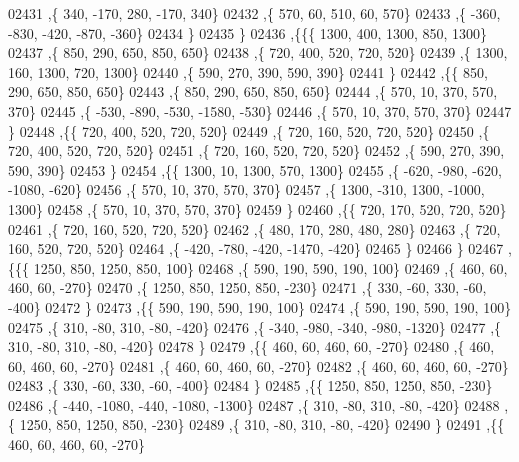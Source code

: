 \begin{DoxyCode}
02431     ,\{   340,  -170,   280,  -170,   340\}
02432     ,\{   570,    60,   510,    60,   570\}
02433     ,\{  -360,  -830,  -420,  -870,  -360\}
02434     \}
02435    \}
02436   ,\{\{\{  1300,   400,  1300,   850,  1300\}
02437     ,\{   850,   290,   650,   850,   650\}
02438     ,\{   720,   400,   520,   720,   520\}
02439     ,\{  1300,   160,  1300,   720,  1300\}
02440     ,\{   590,   270,   390,   590,   390\}
02441     \}
02442    ,\{\{   850,   290,   650,   850,   650\}
02443     ,\{   850,   290,   650,   850,   650\}
02444     ,\{   570,    10,   370,   570,   370\}
02445     ,\{  -530,  -890,  -530, -1580,  -530\}
02446     ,\{   570,    10,   370,   570,   370\}
02447     \}
02448    ,\{\{   720,   400,   520,   720,   520\}
02449     ,\{   720,   160,   520,   720,   520\}
02450     ,\{   720,   400,   520,   720,   520\}
02451     ,\{   720,   160,   520,   720,   520\}
02452     ,\{   590,   270,   390,   590,   390\}
02453     \}
02454    ,\{\{  1300,    10,  1300,   570,  1300\}
02455     ,\{  -620,  -980,  -620, -1080,  -620\}
02456     ,\{   570,    10,   370,   570,   370\}
02457     ,\{  1300,  -310,  1300, -1000,  1300\}
02458     ,\{   570,    10,   370,   570,   370\}
02459     \}
02460    ,\{\{   720,   170,   520,   720,   520\}
02461     ,\{   720,   160,   520,   720,   520\}
02462     ,\{   480,   170,   280,   480,   280\}
02463     ,\{   720,   160,   520,   720,   520\}
02464     ,\{  -420,  -780,  -420, -1470,  -420\}
02465     \}
02466    \}
02467   ,\{\{\{  1250,   850,  1250,   850,   100\}
02468     ,\{   590,   190,   590,   190,   100\}
02469     ,\{   460,    60,   460,    60,  -270\}
02470     ,\{  1250,   850,  1250,   850,  -230\}
02471     ,\{   330,   -60,   330,   -60,  -400\}
02472     \}
02473    ,\{\{   590,   190,   590,   190,   100\}
02474     ,\{   590,   190,   590,   190,   100\}
02475     ,\{   310,   -80,   310,   -80,  -420\}
02476     ,\{  -340,  -980,  -340,  -980, -1320\}
02477     ,\{   310,   -80,   310,   -80,  -420\}
02478     \}
02479    ,\{\{   460,    60,   460,    60,  -270\}
02480     ,\{   460,    60,   460,    60,  -270\}
02481     ,\{   460,    60,   460,    60,  -270\}
02482     ,\{   460,    60,   460,    60,  -270\}
02483     ,\{   330,   -60,   330,   -60,  -400\}
02484     \}
02485    ,\{\{  1250,   850,  1250,   850,  -230\}
02486     ,\{  -440, -1080,  -440, -1080, -1300\}
02487     ,\{   310,   -80,   310,   -80,  -420\}
02488     ,\{  1250,   850,  1250,   850,  -230\}
02489     ,\{   310,   -80,   310,   -80,  -420\}
02490     \}
02491    ,\{\{   460,    60,   460,    60,  -270\}

\end{DoxyCode}
